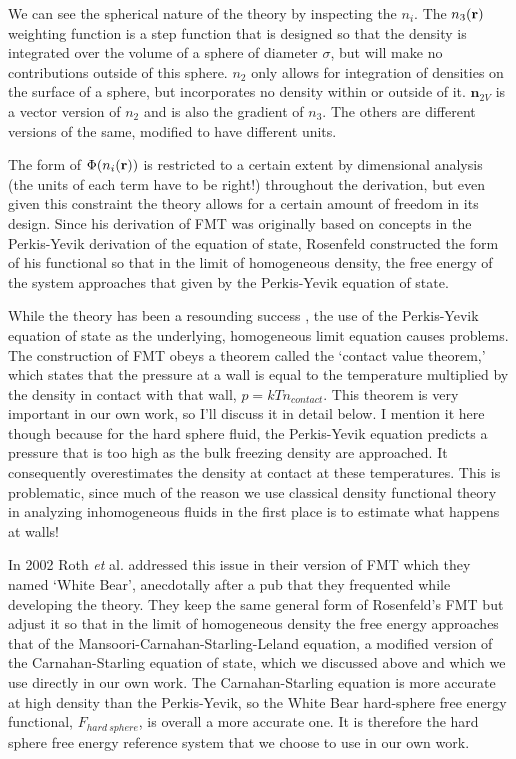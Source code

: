 We can see the spherical nature of the theory by inspecting the $n_i$.
The $n_3(\textbf{r})$ weighting function is a step function that is designed
so that the density is integrated over the volume of a sphere of
diameter $\sigma$, but will make no contributions outside of this
sphere.  $n_2$ only allows for integration of densities on the surface
of a sphere, but incorporates no density within or outside of it.
$\mathbf{n}_{2V}$ is a vector version of $n_2$ and is also the
gradient of $n_3$.  The others are different versions of the same,
modified to have different units.

The form of $\Phi({n_i(\textbf{r})})$ is restricted to a certain extent by
dimensional analysis (the units of each term have to be right!)
throughout the derivation, but even given this constraint the theory
allows for a certain amount of freedom in its design.  Since his
derivation of FMT was originally based on concepts in the Perkis-Yevik
derivation of the equation of state, Rosenfeld constructed the form of
his functional so that in the limit of homogeneous density, the free
energy of the system approaches that given by the Perkis-Yevik
equation of state.

While the theory has been a resounding
  success \cite{rosenfeld1989free,rosenfeld1990free,rosenfeld1997fundamental},
  the use of the Perkis-Yevik equation of state as the underlying,
  homogeneous limit equation causes problems.  The construction of FMT
  obeys a theorem called the `contact value theorem,' which states
  that the pressure at a wall is equal to the temperature multiplied
  by the density in contact with that wall, $p=kTn_{contact}$. This
  theorem is very important in our own work, so I'll discuss it in
  detail below.  I mention it here though because for the hard sphere
  fluid, the Perkis-Yevik equation predicts a pressure that is too
  high as the bulk freezing density are approached.  It consequently
  overestimates the density at contact at these temperatures.  This is
  problematic, since much of the reason we use classical density
  functional theory in analyzing inhomogeneous fluids in the first
  place is to estimate what happens at walls!

In 2002 Roth \emph{et} al. addressed this issue in their version of
FMT which they named `White
Bear'\cite{roth2002whitebear,hansen2006density}, anecdotally after a
pub that they frequented while developing the theory.  They keep the
same general form of Rosenfeld's FMT but adjust it so that in the
limit of homogeneous density the free energy approaches that of the
Mansoori-Carnahan-Starling-Leland equation, a modified version of the
Carnahan-Starling equation of state, which we discussed above and
which we use directly in our own work.  The Carnahan-Starling equation
is more accurate at high density than the Perkis-Yevik, so the White
Bear hard-sphere free energy functional, $F_{hard~sphere}$, is overall
a more accurate one.  It is therefore the hard sphere free energy
reference system that we choose to use in our own work.


